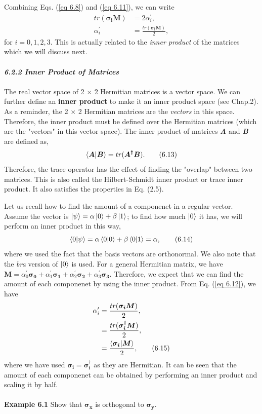 \documentclass{article}
\newcommand{\bfit}[1]{\textit{\textbf{#1}}}
\begin{document}
Combining Eqs. (\ref{eq 6.8}) and (\ref{eq 6.11}), we can write
\begin{align*} \label{eq 6.12}
    tr(\boldsymbol{\sigma_iM})&=2\alpha_i^\prime,\\
    \alpha_i^\prime&=\frac{tr(\boldsymbol{\sigma_iM})}{2},\tag{6.12    }
\end{align*}
for $i= 0, 1, 2, 3$. This is actually related to the \textit{inner product}
of the matrices which we will discuss next.\\\\
\bfit{\large 6.2.2 Inner Product of Matrices}\\\\
The real vector space of 2 $\times$ 2 Hermitian matrices is a vector space.
We can further define an \textbf{inner product} to make it an inner product space (see Chap.2).
As a reminder, the 2 $\times$ 2 Hermitian matrices are the \textit{vectors}
in this space. Therefore, the inner product must be defined over the Hermitian
matrices (which are the "vectors" in this vector space). The inner product of matrices
\bfit{A} and \bfit{B} are defined as,
\begin{equation} \label{eq 6.13}
    \braket{\boldsymbol{A|B}}=tr(\boldsymbol{A^{\dagger}B}). \tag{6.13}
\end{equation}
Therefore, the trace operator has the effect of finding the "overlap" between two
matrices. This is also called the Hilbert-Schmidt inner product or trace inner product.
It also satisfies the properties in Eq. (2.5).

Let us recall how to find the amount of a componenet in a regular vector.
Assume the vector is $\ket{\psi}=\alpha\ket{0}+\beta\ket{1}$; to find how much 
$\ket{0}$ it has, we will perform an inner product in this way,
\begin{equation}\label{eq 6.14}
    \braket{0|\psi}=\alpha\braket{0|0}+\beta\braket{0|1}=\alpha,\tag{6.14}
\end{equation}
where we used the fact that the basis vectors are orthonormal. We also note that the
\textit{bra} version of $\ket{0}$ is used. For a general Hermitian matrix, we have $\boldsymbol{M}=
\alpha_0^\prime\boldsymbol{\sigma_0}+\alpha_1^\prime\boldsymbol{\sigma_1}+
\alpha_2^\prime\boldsymbol{\sigma_2}+\alpha_3^\prime\boldsymbol{\sigma_3}$.
Therefore, we expect that we can find the amount of each componenet by using
the inner product. From Eq. (\ref{eq 6.12}), we have
\begin{align*}\label{eq 6.15}
    \alpha_i^\prime&=\frac{tr(\boldsymbol{\sigma_iM})}{2},\\
    &=\frac{tr(\boldsymbol{\sigma_i^{\dagger}M})}{2},\\
    &=\frac{\braket{\boldsymbol{\sigma_i|M}}}{2},\tag{6.15}
\end{align*}
where we have used $\boldsymbol{\sigma_i}=\boldsymbol{\sigma_i^{\dagger}}$ as they
are Hermitian. It can be seen that the amount of each componenet can be obtained by performing
an inner product and scaling it by half.\\\\
\textbf{Example 6.1} Show that $\boldsymbol{\sigma_x}$ is orthogonal to $\boldsymbol{\sigma_y}$.
\end{document}
